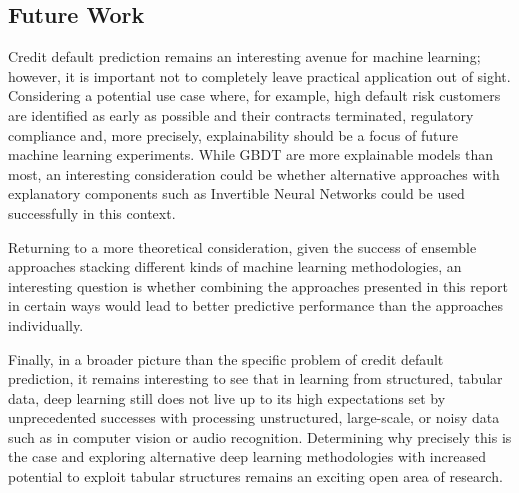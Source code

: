 \documentclass[runningheads]{llncs}
\begin{document}





\subsection{Future Work}

Credit default prediction remains an interesting avenue for machine learning; however, it is important not to completely leave practical application out of sight. Considering a potential use case where, for example, high default risk customers are identified as early as possible and their contracts terminated, regulatory compliance and, more precisely, explainability should be a focus of future machine learning experiments. While GBDT are more explainable models than most, an interesting consideration could be whether alternative approaches with explanatory components such as Invertible Neural Networks could be used successfully in this context.

Returning to a more theoretical consideration, given the success of ensemble approaches stacking different kinds of machine learning methodologies, an interesting question is whether combining the approaches presented in this report in certain ways would lead to better predictive performance than the approaches individually.

Finally, in a broader picture than the specific problem of credit default prediction, it remains interesting to see that in learning from structured, tabular data, deep learning still does not live up to its high expectations set by unprecedented successes with processing unstructured, large-scale, or noisy data such as in computer vision or audio recognition. Determining why precisely this is the case and exploring alternative deep learning methodologies with increased potential to exploit tabular structures remains an exciting open area of research.

\end{document}

